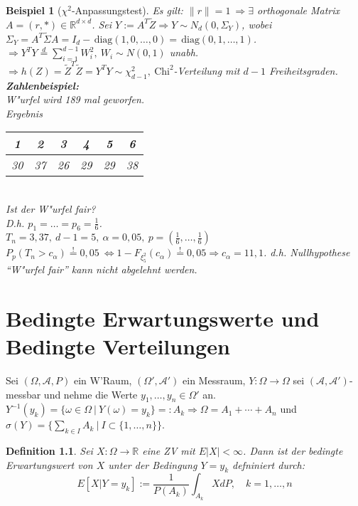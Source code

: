 \documentclass[a4paper,11pt]{book}
\newcommand{\R}{{\mathbb R}}
\newcommand{\diag}{\ensuremath{\,\text{diag}}}
\def\AA{ \mathcal{A} }
\newtheorem*{DefON}{Definition}
\newtheorem{Bsp}{Beispiel}[chapter]
\theoremstyle{nonumberplain}
\begin{document}
\begin{Bsp}[$\chi^2$-Anpassungstest]
Es gilt: $\|r\| = 1\ \Rightarrow \exists$ orthogonale Matrix $A = (r, \ast) \in \R^{d \times d}$. Sei $Y := A^T \tilde{Z} \Rightarrow Y \sim N_d(0, \Sigma_Y)$, wobei $\Sigma_Y = A^T \tilde{\Sigma} A = I_d - \diag(1,0,\dots,0) = \diag (0,1,\dots,1)$.\\
$\Rightarrow Y^T Y \stackrel{d}{=} \sum_{i=1}^{d-1} W_i^2,\ W_i \sim N(0,1)$ unabh. $\Rightarrow h(Z) = \tilde{Z}^T \tilde{Z} = Y^T Y \sim \chi_{d-1}^2,\ \text{Chi}^2$-Verteilung mit $d-1$ Freiheitsgraden.\\
\textbf{Zahlenbeispiel:}\\
W"urfel wird 189 mal geworfen.\\
Ergebnis
\begin{tabular}{|c|c|c|c|c|c|}
1 & 2 & 3 & 4 & 5 & 6 \\
\hline
30 & 37 & 26 & 29 & 29 & 38
\end{tabular}\\
Ist der W"urfel fair?\\
D.h. $p_1 = \dots = p_6 = \frac16$.\\
$T_n = 3,37,\ d-1 = 5,\ \alpha = 0,05,\ p = (\frac16,\dots,\frac16)$\\
$P_p(T_n > c_{\alpha}) \stackrel{!}{=} 0,05 \ \Leftrightarrow 1 - F_{\xi_5^2}(c_{\alpha}) \stackrel{!}{=} 0,05 \Rightarrow c_{\alpha} = 11,1$. d.h. Nullhypothese ``W"urfel fair'' kann nicht abgelehnt werden.
\end{Bsp}

\chapter{Bedingte Erwartungswerte und Bedingte Verteilungen}
Sei $(\Omega,\AA,P)$ ein W'Raum, $(\Omega',\AA')$ ein Messraum, $Y: \Omega \rightarrow \Omega$ sei $(\AA,\AA')$-messbar und nehme die Werte $y_1,\dots,y_n \in \Omega'$ an. $Y^{-1}(y_k) = \{ \omega \in \Omega\ |\ Y(\omega) = y_k \} =: A_k \Rightarrow \Omega = A_1 + \cdots + A_n$ und $\sigma(Y) = \{ \sum_{k \in I} A_k\ |\ I \subset \{1,\dots,n\} \}$.

\begin{DefON}
Sei $X: \Omega \rightarrow \R$ eine ZV mit $E|X| < \infty$. Dann ist der bedingte Erwartungswert von $X$ unter der Bedingung $Y = y_k$ defniniert durch:
\[
E[X | Y = y_k ] := \frac1{P(A_k)} \int_{A_k} X dP, \quad k = 1,\dots,n
\]
\end{DefON}

\end{document}
